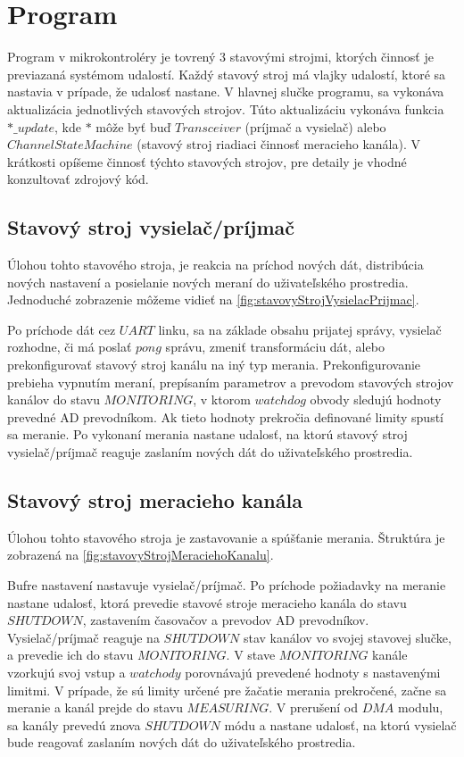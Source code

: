 \documentclass[main.tex]{subfiles}
\begin{document}
	\section{Program}
		\begin{multicols*}{2}
			\noindent Program v mikrokontroléry je tovrený 3 stavovými strojmi, ktorých činnosť je previazaná systémom udalostí. Každý stavový stroj má vlajky udalostí, ktoré sa nastavia v prípade, že udalosť nastane. V hlavnej slučke programu, sa vykonáva aktualizácia jednotlivých stavových strojov. Túto aktualizáciu vykonáva funkcia $*\_update$, kde $*$ môže byť buď $Transceiver$ (príjmač a vysielač) alebo $ChannelStateMachine$ (stavový stroj riadiaci činnosť meracieho kanála). V krátkosti opíšeme činnosť týchto stavových strojov, pre detaily je vhodné konzultovať zdrojový kód.
			
			\subsection{Stavový stroj vysielač/príjmač}
			Úlohou tohto stavového stroja, je reakcia na príchod nových dát, distribúcia nových nastavení a posielanie nových meraní do uživateľského prostredia. Jednoduché zobrazenie môžeme vidieť na \cref{fig:stavovyStrojVysielacPrijmac}.
			
			Po príchode dát cez $UART$ linku, sa na základe obsahu prijatej správy, vysielač rozhodne, či má poslať $pong$ správu, zmeniť transformáciu dát, alebo prekonfigurovať stavový stroj kanálu na iný typ merania. Prekonfigurovanie prebieha vypnutím meraní, prepísaním parametrov a prevodom stavových strojov kanálov do stavu $MONITORING$, v ktorom $watchdog$ obvody sledujú hodnoty prevedné AD prevodníkom. Ak tieto hodnoty prekročia definované limity spustí sa meranie. Po vykonaní merania nastane udalosť, na ktorú stavový stroj vysielač/príjmač reaguje zaslaním nových dát do uživateľského prostredia.
			
			
			\vskip 0.25cm
			
			\subsection{Stavový stroj meracieho kanála}
			Úlohou tohto stavového stroja je zastavovanie a spúšťanie merania. Štruktúra je zobrazená na \cref{fig:stavovyStrojMeraciehoKanalu}.

			Bufre nastavení nastavuje vysielač/príjmač. Po príchode požiadavky na meranie nastane udalosť, ktorá prevedie stavové stroje meracieho kanála do stavu $SHUTDOWN$, zastavením časovačov a prevodov AD prevodníkov. Vysielač/príjmač reaguje na $SHUTDOWN$ stav kanálov vo svojej stavovej slučke, a prevedie ich do stavu $MONITORING$. V stave $MONITORING$ kanále vzorkujú svoj vstup a $watchody$ porovnávajú prevedené hodnoty s nastavenými limitmi. V prípade, že sú limity určené pre žačatie merania prekročené, začne sa meranie a kanál prejde do stavu $MEASURING$. V prerušení od $DMA$ modulu, sa kanály prevedú znova $SHUTDOWN$ módu a nastane udalosť, na ktorú vysielač bude reagovať zaslaním nových dát do uživateľského prostredia.
			
			
			\vskip 0.25cm
			
			
			
		\end{multicols*}
\end{document}
